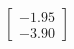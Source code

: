 \documentclass[preview]{standalone}
\begin{document}
\begin{align*}
\begin{bmatrix} -1.95 \\ -3.90 \end{bmatrix}
\end{align*}
\end{document}
